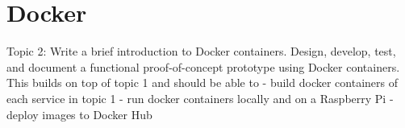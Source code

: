 \chapter{Docker}\label{ch:docker}
Topic 2: Write a brief introduction to Docker containers.  Design, develop, test, and document a functional proof-of-concept prototype using Docker containers. This builds on top of topic 1 and should be able to
- build docker containers of each service in topic 1
- run docker containers locally and on a Raspberry Pi
- deploy images to Docker Hub


